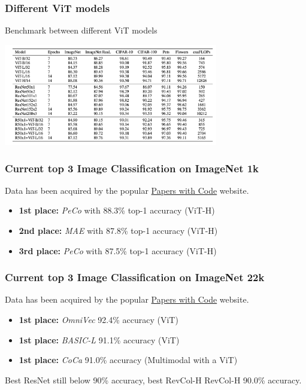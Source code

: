\begin{frame}
\frametitle{Different ViT models}
Benchmark between different ViT models
\begin{center}
    \includegraphics[width=0.7\textwidth]{img/4-section/More-benchmark.png}
\end{center}

\end{frame}


\begin{frame}
\frametitle{Current top 3 Image Classification on ImageNet 1k}
Data has been acquired by the popular \href{https://paperswithcode.com/sota/image-classification-on-imagenet?tag_filter=171}{Papers with Code} website.


\begin{itemize}
    \item \textbf{1st place:} \textit{PeCo} with 88.3\% top-1 accuracy (ViT-H)
    \item \textbf{2nd place:} \textit{MAE} with 87.8\% top-1 accuracy (ViT-H)
    \item \textbf{3rd place:} \textit{PeCo} with 87.5\% top-1 accuracy (ViT-H)
\end{itemize}

\end{frame}

\begin{frame}
\frametitle{Current top 3 Image Classification on ImageNet 22k}
Data has been acquired by the popular \href{https://paperswithcode.com/sota/image-classification-on-imagenet}{Papers with Code} website.


\begin{itemize}
    \item \textbf{1st place:} \textit{OmniVec} 92.4\% accuracy (ViT)
    \item \textbf{1st place:} \textit{BASIC-L} 91.1\% accuracy (ViT)
    \item \textbf{1st place:} \textit{CoCa} 91.0\% accuracy (Multimodal with a ViT)
\end{itemize}

Best ResNet still below 90\% accuracy, best RevCol-H RevCol-H 90.0\% accuracy.

\end{frame}